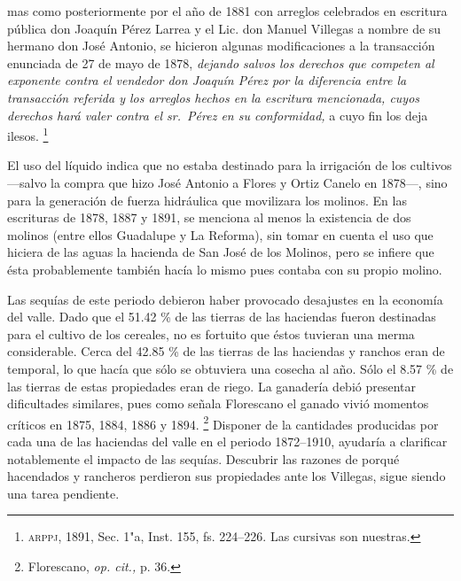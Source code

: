 \documentclass[14pt,twoside,final]{extbook} %
\let\oldfootnote\footnote
\renewcommand\footnote[1]{%
\oldfootnote{\hspace{1mm}#1}}
\begin{document}
\begin{quoting}
mas como posteriormente por el año de 1881 con arreglos celebrados en escritura pública don Joaquín Pérez Larrea y el Lic. don Manuel Villegas a nombre de su hermano don José Antonio, se hicieron algunas modificaciones a la transacción enunciada de 27 de mayo de 1878, \emph{dejando salvos los derechos que competen al exponente contra el vendedor don Joaquín Pérez por la diferencia entre la transacción referida y los arreglos hechos en la escritura mencionada, cuyos derechos hará valer contra el sr.~Pérez en su conformidad,} a cuyo fin los deja ilesos.\footnote{\textsc{arppj}, 1891, Sec. 1"a, Inst. 155, fs. 224--226. Las cursivas son nuestras.}
\end{quoting}
El uso del líquido indica que no estaba destinado para la irrigación de los cultivos ---salvo la compra que hizo José Antonio a Flores y Ortiz Canelo en 1878---, sino para la generación de fuerza hidráulica que movilizara los molinos. En las escrituras de 1878, 1887 y 1891, se menciona al menos la existencia de dos molinos (entre ellos Guadalupe y La Reforma), sin tomar en cuenta el uso que hiciera de las aguas la hacienda de San José de los Molinos, pero se infiere que ésta probablemente también hacía lo mismo pues contaba con su propio molino.

Las sequías de este periodo debieron haber provocado desajustes en la economía del valle. Dado que el 51.42 \% de las tierras de las haciendas fueron destinadas para el cultivo de los cereales, no es fortuito que éstos tuvieran una merma considerable. Cerca del 42.85 \% de las tierras de las haciendas y ranchos eran de temporal, lo que hacía que sólo se obtuviera una cosecha al año. Sólo el 8.57 \% de las tierras de estas propiedades eran de riego. La ganadería debió presentar dificultades similares, pues como señala Florescano el ganado vivió momentos críticos en 1875, 1884, 1886 y 1894.\footnote{Florescano, \emph{op. cit.,} p. 36.} Disponer de la cantidades producidas por cada una de las haciendas del valle en el periodo 1872--1910, ayudaría a clarificar notablemente el impacto de las sequías. Descubrir las razones de porqué hacendados y rancheros perdieron sus propiedades ante los Villegas, sigue siendo una tarea pendiente.
\end{document}
